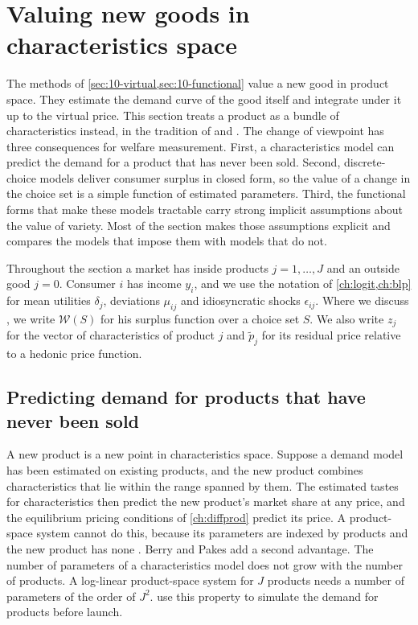 \section{Valuing new goods in characteristics space}\label{sec:10-charspace}

The methods of \cref{sec:10-virtual,sec:10-functional} value a new good in product space. They estimate the
demand curve of the good itself and integrate under it up to the virtual price. This section treats a product
as a bundle of characteristics instead, in the tradition of \citet{Lancaster1966,Lancaster1971} and
\citet{McFadden1981}. The change of viewpoint has three consequences for welfare measurement. First, a
characteristics model can predict the demand for a product that has never been sold. Second, discrete-choice
models deliver consumer surplus in closed form, so the value of a change in the choice set is a simple function
of estimated parameters. Third, the functional forms that make these models tractable carry strong implicit
assumptions about the value of variety. Most of the section makes those assumptions explicit and compares the
models that impose them with models that do not.

Throughout the section a market has inside products $j = 1,\dots,J$ and an outside good $j = 0$. Consumer $i$
has income $y_i$, and we use the notation of \cref{ch:logit,ch:blp} for mean utilities $\delta_j$, deviations
$\mu_{ij}$ and idiosyncratic shocks $\epsilon_{ij}$. Where we discuss \citet{Trajtenberg1989}, we write
$\mathcal{W}(S)$ for his surplus function over a choice set $S$. We also write $z_j$ for the vector of
characteristics of product $j$ and $\tilde p_j$ for its residual price relative to a hedonic price function.

\subsection{Predicting demand for products that have never been sold}\label{sec:10-cs-predict}

A new product is a new point in characteristics space. Suppose a demand model has been estimated on existing
products, and the new product combines characteristics that lie within the range spanned by them. The estimated
tastes for characteristics then predict the new product's market share at any price, and the equilibrium pricing
conditions of \cref{ch:diffprod} predict its price. A product-space system cannot do this, because its
parameters are indexed by products and the new product has none \citep[pp.~1--2]{BerryPakes2007}. Berry and
Pakes add a second advantage. The number of parameters of a characteristics model does not grow with the number
of products. A log-linear product-space system for $J$ products needs a number of parameters of the order of $J^2$.  use this property to simulate the demand for products before launch.

